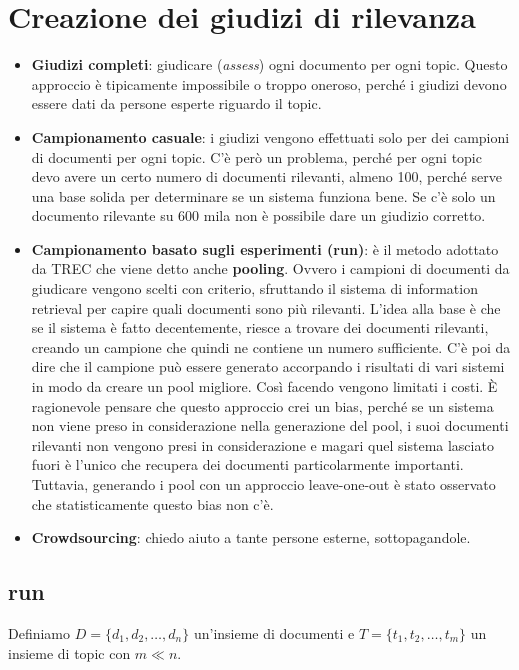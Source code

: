 \section{Creazione dei giudizi di rilevanza}

\begin{itemize}
	\item \textbf{Giudizi completi}: giudicare (\textit{assess}) ogni documento per ogni topic. Questo approccio è tipicamente impossibile o troppo oneroso, perché i giudizi devono essere dati da persone esperte riguardo il topic.
	\item \textbf{Campionamento casuale}: i giudizi vengono effettuati solo per dei campioni di documenti per ogni topic. C'è però un problema, perché per ogni topic devo avere un certo numero di documenti rilevanti, almeno 100, perché serve una base solida per determinare se un sistema funziona bene. Se c'è solo un documento rilevante su 600 mila non è possibile dare un giudizio corretto.
	\item \textbf{Campionamento basato sugli esperimenti (run)}: è il metodo adottato da TREC che viene detto anche \textbf{pooling}. Ovvero i campioni di documenti da giudicare vengono scelti con criterio, sfruttando il sistema di information retrieval per capire quali documenti sono più rilevanti.
	L'idea alla base è che se il sistema è fatto decentemente, riesce a trovare dei documenti rilevanti, creando un campione che quindi ne contiene un numero sufficiente.
	C'è poi da dire che il campione può essere generato accorpando i risultati di vari sistemi in modo da creare un pool migliore.
	Così facendo vengono limitati i costi.
	\`E ragionevole pensare che questo approccio crei un bias, perché se un sistema non viene preso in considerazione nella generazione del pool, i suoi documenti rilevanti non vengono presi in considerazione e magari quel sistema lasciato fuori è l'unico che recupera dei documenti particolarmente importanti.
	Tuttavia, generando i pool con un approccio leave-one-out è stato osservato che statisticamente questo bias non c'è.
	\item \textbf{Crowdsourcing}: chiedo aiuto a tante persone esterne, sottopagandole.
\end{itemize}

\subsection{run}

Definiamo $D = \{d_1, d_2, \ldots, d_n \}$ un'insieme di documenti e $T = \{ t_1, t_2, \ldots, t_m \}$ un insieme di topic con $m \ll n$.

